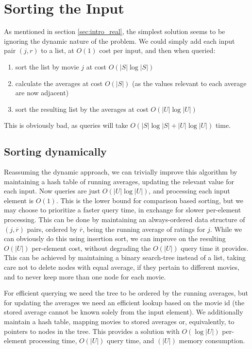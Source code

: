 \section{Sorting the Input}
As mentioned in section \ref{sec:intro_real}, the simplest solution seems to be
ignoring the dynamic nature of the problem. We could simply add each input pair
$(j,r)$ to a list, at $O(1)$ cost per input, and then when queried:
\begin{enumerate}
	\item sort the list by movie $j$ at cost $O(|S| \log |S|)$
	\item calculate the averages at cost $O(|S|)$ (as the values relevant to
		each average are now adjacent)
	\item sort the resulting list by the averages at cost $O(|U| \log |U|)$
\end{enumerate}

This is obviously bad, as queries will take $O(|S| \log |S| + |U| \log|U|)$
time.
\subsection{Sorting dynamically}
Reassuming the dynamic approach, we can trivially improve this algorithm
by maintaining a hash table of running averages, updating the relevant value for
each input. Now queries are just $O(|U| \log |U|)$, and processing each input
element is $O(1)$. This is the lower bound for comparison based sorting, but we
may choose to prioritize a faster query time, in exchange for slower per-element
processing. This can be done by maintaining an always-ordered data structure of
$(j, \overline r)$ pairs, ordered by $\overline r$, being the running average of
ratings for $j$. While we can obviously do this using insertion sort, we can
improve on the resulting $O(|U|)$ per-element cost, without degrading the $O(|U|)$
query time it provides. This can be achieved by maintaining a binary search-tree
instead of a list, taking care not to delete nodes with equal average, if they
pertain to different movies, and to never keep more than one node for each
movie.

For efficient querying we need the tree to be ordered by the
running averages, but for updating the averages we need an efficient lookup
based on the movie id (the stored average cannot be known solely from the input
element). We additionally maintain a hash table, mapping movies to stored
averages or, equivalently, to pointers to nodes in the tree. This provides a
solution with $O(\log |U|)$ per-element processing time, $O(|U|)$ query
time, and $(|U|)$ memory consumption.

